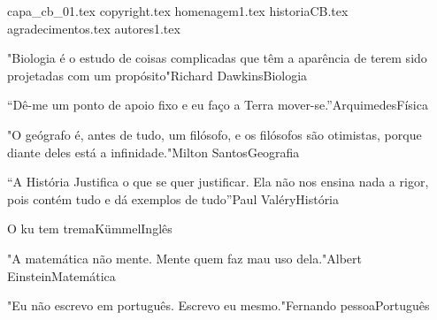 \documentclass[a4paper, 11pt, twoside]{book}
\newcommand{\numapostila}{1}		%
\newcommand{\capBio}{3}				%
\newcommand{\capFis}{3}				%
\newcommand{\capGeo}{3}				%
\newcommand{\capHis}{3}				%
\newcommand{\capIng}{3}				%
\newcommand{\capMat}{3}				%
\newcommand{\capPor}{3}				%
\begin{document}
	

	\frontmatter
	
	{capa_cb_0\numapostila.tex}
	{copyright.tex}	
	{homenagem\numapostila.tex}
	{historiaCB.tex} 
	{agradecimentos.tex} 
	{autores\numapostila.tex}
	
	\pagecolor{fundo}
	\tableofcontents	
	
	\mainmatter
	\pagecolor{fundo}
	\begin{parte}{"Biologia é o estudo de coisas complicadas que têm a aparência de terem sido projetadas com um propósito"}{Richard Dawkins}{Biologia}
		\capitulos{\pathbiologia}{\capBio}
	\end{parte}
	
	\begin{parte}{“Dê-me um ponto de apoio fixo e eu faço a Terra mover-se.”}{Arquimedes}{Física}
		\capitulos{\pathfisica}{\capFis}
	\end{parte}
	
	\begin{parte}{"O geógrafo é, antes de tudo, um filósofo, e os filósofos são otimistas, porque diante deles está a infinidade."}{Milton Santos}{Geografia}
		\capitulos{\pathgeografia}{\capGeo}
	\end{parte}
	
	\begin{parte}{“A História Justifica o que se quer justificar. Ela não nos ensina nada a rigor, pois contém tudo e dá exemplos de tudo”}{Paul Valéry}{História}
		\capitulos{\pathhistoria}{\capHis}
	\end{parte}
	
	\begin{parte}{O ku tem trema}{Kümmel}{Inglês}
		\capitulos{\pathingles}{\capIng}
	\end{parte}
	
	\begin{parte}{"A matemática não mente. Mente quem faz mau uso dela."}{Albert Einstein}{Matemática}
		\capitulos{\pathmatematica}{\capMat}
	\end{parte}
	
	\begin{parte}{"Eu não escrevo em português. Escrevo eu mesmo."}{Fernando pessoa}{Português}
		\capitulos{\pathportugues}{\capPor}
	\end{parte}
	
\end{document}
